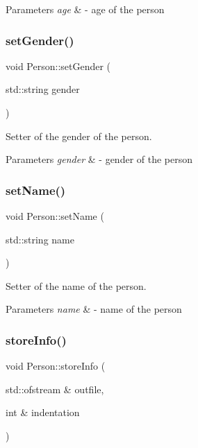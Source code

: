 \begin{DoxyParams}{Parameters}
{\em age} & -\/ age of the person \\
\hline
\end{DoxyParams}
\mbox{\label{class_person_a7625b600d2c9c0b9c9fc060a6906dac6}} 
\subsubsection{\texorpdfstring{set\+Gender()}{setGender()}}
{\footnotesize\ttfamily void Person\+::set\+Gender (\begin{DoxyParamCaption}\item[{std\+::string}]{gender }\end{DoxyParamCaption})}



Setter of the gender of the person. 


\begin{DoxyParams}{Parameters}
{\em gender} & -\/ gender of the person \\
\hline
\end{DoxyParams}
\mbox{\label{class_person_ad6e438f456d3ae6f5b477931c0a6aeba}} 
\subsubsection{\texorpdfstring{set\+Name()}{setName()}}
{\footnotesize\ttfamily void Person\+::set\+Name (\begin{DoxyParamCaption}\item[{std\+::string}]{name }\end{DoxyParamCaption})}



Setter of the name of the person. 


\begin{DoxyParams}{Parameters}
{\em name} & -\/ name of the person \\
\hline
\end{DoxyParams}
\mbox{\label{class_person_a80f87df3f644706c2ad8fc8b800fdd95}} 
\subsubsection{\texorpdfstring{store\+Info()}{storeInfo()}}
{\footnotesize\ttfamily void Person\+::store\+Info (\begin{DoxyParamCaption}\item[{std\+::ofstream \&}]{outfile,  }\item[{int \&}]{indentation }\end{DoxyParamCaption})\hspace{0.3cm}{\ttfamily [virtual]}}



